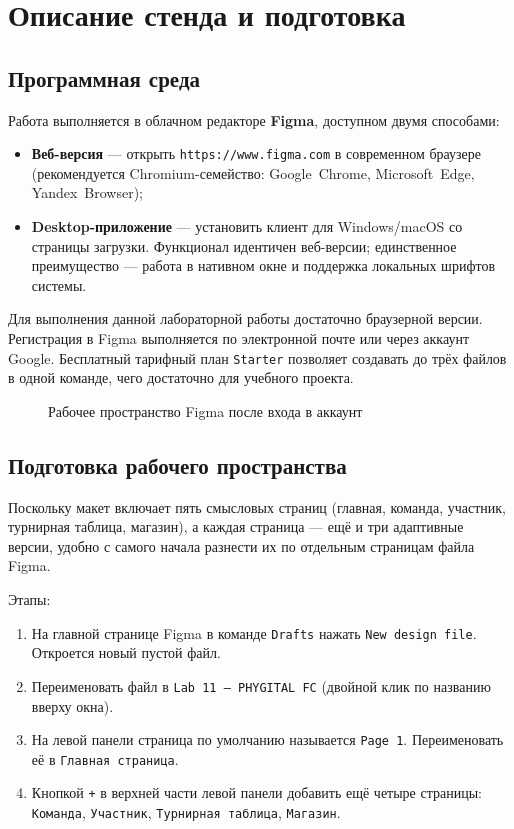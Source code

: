 \chapter{Описание стенда и подготовка}
\label{ch:stand}

\section{Программная среда}

Работа выполняется в облачном редакторе \textbf{Figma}, доступном двумя
способами:
\begin{itemize}
  \item \textbf{Веб-версия} --- открыть \texttt{https://www.figma.com}
        в современном браузере (рекомендуется Chromium-семейство:
        Google~Chrome, Microsoft~Edge, Yandex~Browser);
  \item \textbf{Desktop-приложение} --- установить клиент для
        Windows/macOS со страницы загрузки. Функционал идентичен
        веб-версии; единственное преимущество --- работа в нативном окне
        и поддержка локальных шрифтов системы.
\end{itemize}
Для выполнения данной лабораторной работы достаточно браузерной версии.
Регистрация в Figma выполняется по электронной почте или через аккаунт
Google. Бесплатный тарифный план \texttt{Starter} позволяет создавать
до трёх файлов в одной команде, чего достаточно для учебного проекта.

\begin{figure}[h]
  \centering
  \caption{Рабочее пространство Figma после входа в аккаунт}
  \label{fig:workspace}
\end{figure}

\section{Подготовка рабочего пространства}

Поскольку макет включает пять смысловых страниц (главная, команда,
участник, турнирная таблица, магазин), а каждая страница --- ещё и три
адаптивные версии, удобно с самого начала разнести их по отдельным
страницам файла Figma.

Этапы:
\begin{enumerate}
  \item На главной странице Figma в команде \texttt{Drafts} нажать
        \texttt{New design file}. Откроется новый пустой файл.
  \item Переименовать файл в \texttt{Lab~11~--~PHYGITAL~FC}
        (двойной клик по названию вверху окна).
  \item На левой панели страница по умолчанию называется
        \texttt{Page~1}. Переименовать её в \texttt{Главная страница}.
  \item Кнопкой \texttt{+} в верхней части левой панели добавить ещё
        четыре страницы: \texttt{Команда}, \texttt{Участник},
        \texttt{Турнирная таблица}, \texttt{Магазин}.
\end{enumerate}

